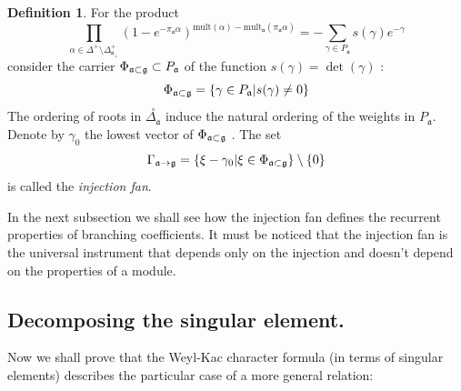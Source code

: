 \documentclass[12pt]{iopart}
\theoremstyle{definition}
\newtheorem{definition}{Definition}
\newcommand{\co}[1]{\stackrel{\circ }{#1}}
\newcommand{\af}{\mathfrak{a}}
\newcommand{\afb}{\mathfrak{a}_{\bot}}
\begin{document}
\begin{definition}
\label{fan-definition} For the product
\begin{equation}
\prod_{\alpha \in \Delta ^{+}\setminus \Delta _{\afb }^{+}}\left( 1-e^{-\pi
_{\af}\alpha }\right) ^{\mathrm{mult}(\alpha )-\mathrm{mult}_{\af%
}(\pi _{\af}\alpha )}=-\sum_{\gamma \in P_{\af}}s(\gamma
)e^{-\gamma }  \label{eq:6}
\end{equation}
consider the carrier $\Phi _{\af\subset \frak{g}}\subset P_{\af}$
of the function $s(\gamma )=\det \left( \gamma \right) $ :
\begin{equation}
\Phi _{\af\subset \frak{g}}=\left\{ \gamma \in P_{\af}|s(\gamma
)\neq 0\right\}   \label{eq:37}
\end{equation}
The ordering of roots in $\co{\Delta _{\af}}$ induce the
natural ordering of the weights in $P_{\af}$. Denote by $\gamma _{0}$
the lowest vector of $\Phi _{\af\subset \frak{g}}$ . The set
\begin{equation}
\Gamma _{\af\rightarrow \frak{g}}=\left\{ \xi -\gamma _{0}|\xi \in \Phi _{%
\af\subset \frak{g}}\right\} \setminus \left\{ 0\right\}
\label{fan-defined}
\end{equation}
is called the \textit{injection fan}.
\end{definition}
In the next subsection we shall see how the injection fan defines the recurrent
properties of branching coefficients. It must be noticed that the injection fan is
the universal instrument that depends only on the injection and doesn't depend on 
the properties of a module.

\subsection{Decomposing the singular element.}
\label{subsec:decomp-sing-element}

Now we shall prove that the Weyl-Kac character formula (in terms of singular
elements) describes the particular case of a more general relation:
\end{document}
